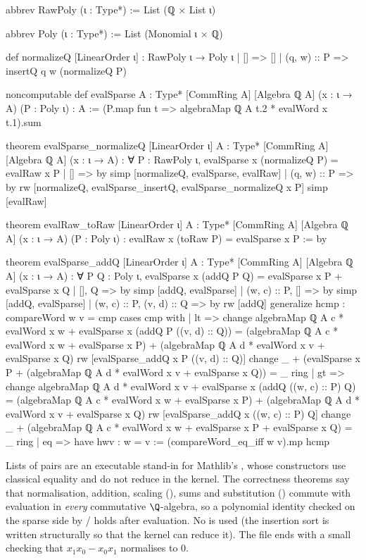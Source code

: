 \begin{leancode}
abbrev RawPoly (ι : Type*) := List (ℚ × List ι)

abbrev Poly (ι : Type*) := List (Monomial ι × ℚ)

def normalizeQ [LinearOrder ι] : RawPoly ι → Poly ι
  | [] => []
  | (q, w) :: P => insertQ q w (normalizeQ P)

noncomputable def evalSparse {A : Type*} [CommRing A] [Algebra ℚ A]
    (x : ι → A) (P : Poly ι) : A :=
  (P.map fun t => algebraMap ℚ A t.2 * evalWord x t.1).sum

theorem evalSparse_normalizeQ [LinearOrder ι]
    {A : Type*} [CommRing A] [Algebra ℚ A] (x : ι → A) :
    ∀ P : RawPoly ι, evalSparse x (normalizeQ P) = evalRaw x P
  | [] => by simp [normalizeQ, evalSparse, evalRaw]
  | (q, w) :: P => by
      rw [normalizeQ, evalSparse_insertQ, evalSparse_normalizeQ x P]
      simp [evalRaw]

theorem evalRaw_toRaw [LinearOrder ι]
    {A : Type*} [CommRing A] [Algebra ℚ A] (x : ι → A) (P : Poly ι) :
    evalRaw x (toRaw P) = evalSparse x P := by

theorem evalSparse_addQ [LinearOrder ι]
    {A : Type*} [CommRing A] [Algebra ℚ A] (x : ι → A) :
    ∀ P Q : Poly ι,
      evalSparse x (addQ P Q) = evalSparse x P + evalSparse x Q
  | [], Q => by simp [addQ, evalSparse]
  | (w, c) :: P, [] => by simp [addQ, evalSparse]
  | (w, c) :: P, (v, d) :: Q => by
      rw [addQ]
      generalize hcmp : compareWord w v = cmp
      cases cmp with
      | lt =>
          change algebraMap ℚ A c * evalWord x w +
              evalSparse x (addQ P ((v, d) :: Q)) =
            (algebraMap ℚ A c * evalWord x w + evalSparse x P) +
              (algebraMap ℚ A d * evalWord x v + evalSparse x Q)
          rw [evalSparse_addQ x P ((v, d) :: Q)]
          change _ + (evalSparse x P +
            (algebraMap ℚ A d * evalWord x v + evalSparse x Q)) = _
          ring
      | gt =>
          change algebraMap ℚ A d * evalWord x v +
              evalSparse x (addQ ((w, c) :: P) Q) =
            (algebraMap ℚ A c * evalWord x w + evalSparse x P) +
              (algebraMap ℚ A d * evalWord x v + evalSparse x Q)
          rw [evalSparse_addQ x ((w, c) :: P) Q]
          change _ + (algebraMap ℚ A c * evalWord x w + evalSparse x P +
            evalSparse x Q) = _
          ring
      | eq =>
          have hwv : w = v := (compareWord_eq_iff w v).mp hcmp
\end{leancode}

\begin{dictionary}
Lists of pairs are an executable stand-in for Mathlib's , whose constructors use classical
equality and do not reduce in the kernel. The correctness theorems say that normalisation, addition, scaling
(), sums and substitution () commute with evaluation in \emph{every}
commutative $\Q$-algebra, so a polynomial identity checked on the sparse side by / holds
after evaluation. No  is used (the insertion sort is written structurally so that the kernel can
reduce it). The file ends with a small  checking that $x_1x_0 - x_0x_1$ normalises to $0$.
\end{dictionary}


